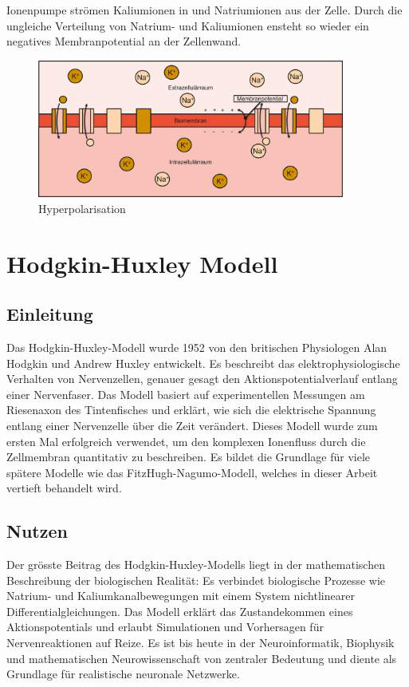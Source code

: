 \begin{refsection}
Ionenpumpe strömen Kaliumionen in und Natriumionen aus der Zelle.
Durch die ungleiche Verteilung von Natrium- und Kaliumionen ensteht so wieder ein negatives Membranpotential an der Zellenwand.
\begin{figure}[H]
    \centering
    \includegraphics[width=0.9\textwidth]{papers/nerven/Bilder/Vorgang5.png}
    \caption{Hyperpolarisation}
    \label{fig:Hyperpolarisation}
\end{figure}

\section{Hodgkin-Huxley Modell}
\subsection{Einleitung}
Das Hodgkin-Huxley-Modell wurde 1952 von den britischen Physiologen Alan Hodgkin und Andrew Huxley entwickelt. Es beschreibt das elektrophysiologische Verhalten von Nervenzellen, genauer gesagt den Aktionspotentialverlauf entlang einer Nervenfaser. Das Modell basiert auf experimentellen Messungen am Riesenaxon des Tintenfisches und erklärt, wie sich die elektrische Spannung entlang einer Nervenzelle über die Zeit verändert. Dieses Modell wurde zum ersten Mal erfolgreich verwendet, um den komplexen Ionenfluss durch die Zellmembran quantitativ zu beschreiben. Es bildet die Grundlage für viele spätere Modelle wie das FitzHugh-Nagumo-Modell, welches in dieser Arbeit vertieft behandelt wird.
\subsection{Nutzen}
Der grösste Beitrag des Hodgkin-Huxley-Modells liegt in der mathematischen Beschreibung der biologischen Realität: Es verbindet biologische Prozesse wie Natrium- und Kaliumkanalbewegungen mit einem System nichtlinearer Differentialgleichungen. Das Modell erklärt das Zustandekommen eines Aktionspotentials und erlaubt Simulationen und Vorhersagen für Nervenreaktionen auf Reize. Es ist bis heute in der Neuroinformatik, Biophysik und mathematischen Neurowissenschaft von zentraler Bedeutung und diente als Grundlage für realistische neuronale Netzwerke.

\end{refsection}
